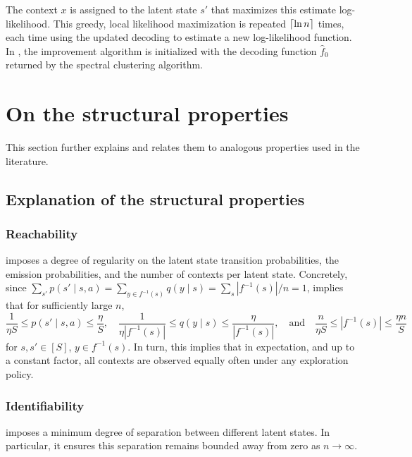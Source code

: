 \documentclass[11pt]{article}
\DeclarePairedDelimiter\ceil{\lceil}{\rceil}
\theoremstyle{definition}
\theoremstyle{definition}
\begin{document}
The context $x$ is assigned to the latent state $s'$ that maximizes this estimate log-likelihood.
This greedy, local likelihood maximization is repeated $\ceil{\ln n}$ times, each time using the updated decoding to estimate a new log-likelihood function.
In , the improvement algorithm is initialized with the decoding function $\hat{f}_0$ returned by the spectral clustering algorithm.

\section{On the structural properties}
\label{sec:on-the-structural-properties}

This section further explains  and relates them to analogous properties used in the literature.

\subsection{Explanation of the structural properties}

\subsubsection{Reachability}

 imposes a degree of regularity on the latent state transition probabilities, the emission probabilities, and the number of contexts per latent state.
Concretely, since $\sum_{s'}p(s'\mid s,a) = \sum_{y\in f^{-1}(s)}q(y\mid s) = \sum_{s} |f^{-1}(s)|/n = 1$,  implies that for sufficiently large $n$,
\begin{equation}
	\label{eqn:bounds_on_elements_of_kernels}
	\frac{1}{\eta S}\leq p(s'\mid s,a)\leq \frac{\eta}{S}
	,
	\quad
	\frac{1}{\eta |f^{-1}(s)|}\leq q(y\mid s)\leq \frac{\eta}{|f^{-1}(s)|}
	,
	\quad
	\mathrm{and}
	\quad
	\frac{n}{\eta S}
	\leq
	|f^{-1}(s)|
	\leq
	\frac{\eta n}{S}
\end{equation}
for $s,s'\in[S]$, $y\in f^{-1}(s)$.
In turn, this implies that in expectation, and up to a constant factor, all contexts are observed equally often under any exploration policy.

\subsubsection{Identifiability}

 imposes a minimum degree of separation between different latent states.
In particular, it ensures this separation remains bounded away from zero as $n\rightarrow \infty$.
\end{document}
